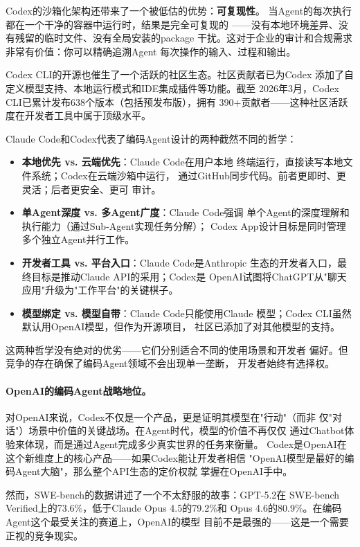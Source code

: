 Codex的沙箱化架构还带来了一个被低估的优势：\textbf{可复现性}。
当Agent的每次执行都在一个干净的容器中运行时，结果是完全可复现的
——没有本地环境差异、没有残留的临时文件、没有全局安装的package
干扰。这对于企业的审计和合规需求非常有价值：你可以精确追溯Agent
每次操作的输入、过程和输出。

Codex CLI的开源也催生了一个活跃的社区生态。社区贡献者已为Codex
添加了自定义模型支持、本地运行模式和IDE集成插件等功能。截至
2026年3月，Codex CLI已累计发布638个版本（包括预发布版），拥有
390+贡献者——这种社区活跃度在开发者工具中属于顶级水平。

\begin{corebox}
Claude Code和Codex代表了编码Agent设计的两种截然不同的哲学：
\begin{itemize}
  \item \textbf{本地优先 vs. 云端优先}：Claude Code在用户本地
    终端运行，直接读写本地文件系统；Codex在云端沙箱中运行，
    通过GitHub同步代码。前者更即时、更灵活；后者更安全、更可
    审计。
  \item \textbf{单Agent深度 vs. 多Agent广度}：Claude Code强调
    单个Agent的深度理解和执行能力（通过Sub-Agent实现任务分解）；
    Codex App设计目标是同时管理多个独立Agent并行工作。
  \item \textbf{开发者工具 vs. 平台入口}：Claude Code是Anthropic
    生态的开发者入口，最终目标是推动Claude API的采用；Codex是
    OpenAI试图将ChatGPT从"聊天应用"升级为"工作平台"的关键棋子。
  \item \textbf{模型绑定 vs. 模型自带}：Claude Code只能使用Claude
    模型；Codex CLI虽然默认用OpenAI模型，但作为开源项目，
    社区已添加了对其他模型的支持。
\end{itemize}
这两种哲学没有绝对的优劣——它们分别适合不同的使用场景和开发者
偏好。但竞争的存在确保了编码Agent领域不会出现单一垄断，
开发者始终有选择权。
\end{corebox}

\paragraph{OpenAI的编码Agent战略地位。}
对OpenAI来说，Codex不仅是一个产品，更是证明其模型在"行动"（而非
仅"对话"）场景中价值的关键战场。在Agent时代，模型的价值不再仅仅
通过Chatbot体验来体现，而是通过Agent完成多少真实世界的任务来衡量。
Codex是OpenAI在这个新维度上的核心产品——如果Codex能让开发者相信
"OpenAI模型是最好的编码Agent大脑"，那么整个API生态的定价权就
掌握在OpenAI手中。

然而，SWE-bench的数据讲述了一个不太舒服的故事：GPT-5.2在
SWE-bench Verified上的73.6\%，低于Claude Opus 4.5的79.2\%和
Opus 4.6的80.9\%。在编码Agent这个最受关注的赛道上，OpenAI的模型
目前不是最强的——这是一个需要正视的竞争现实。

